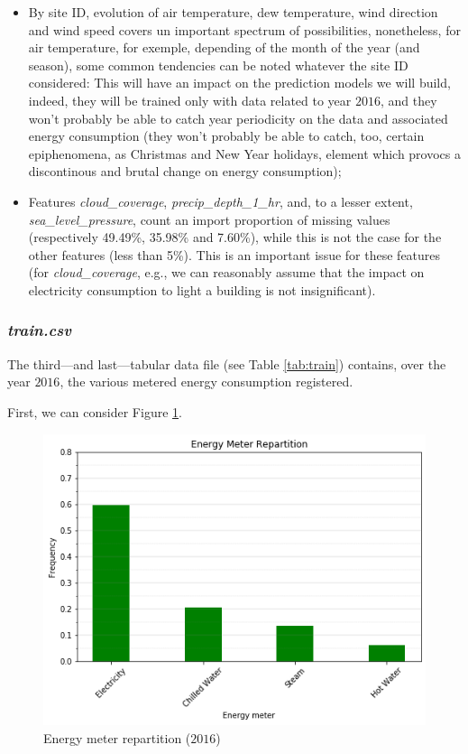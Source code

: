 \documentclass[twocolumn, switch]{article}
\begin{document}
\begin{itemize}
\item By site ID, evolution of air temperature, dew temperature, wind direction and wind speed covers un important spectrum of possibilities, nonetheless, for air temperature, for exemple, depending of the month of the year (and season), some common tendencies can be noted whatever the site ID considered: This will have an impact on the prediction models we will build, indeed, they will be trained only with data related to year $2016$, and they won't probably be able to catch year periodicity on the data and associated energy consumption (they won't probably be able to catch, too, certain epiphenomena, as Christmas and New Year holidays, element which provocs a discontinous and brutal change on energy consumption);
\item Features \textit{cloud\_coverage}, \textit{precip\_depth\_1\_hr}, and, to a lesser extent, \textit{sea\_level\_pressure}, count an import proportion of missing values (respectively 49.49\%, 35.98\% and 7.60\%), while this is not the case for the other features (less than 5\%). This is an important issue for these features (for \textit{cloud\_coverage}, e.g., we can reasonably assume that the impact on electricity consumption to light a building is not insignificant).
\end{itemize}

\subsubsection{\textit{train.csv}}

The third---and last---tabular data file (see Table \ref{tab:train}) contains, over the year $2016$, the various metered energy consumption registered.

First, we can consider Figure \ref{fig:energy_meter_repartition}.

\begin{figure}[H]
\centering
\includegraphics[scale=0.35]{../graphs/energy_meter_repartition}
\caption{Energy meter repartition ($2016$)}
\label{fig:energy_meter_repartition}
\end{figure}
\end{document}
